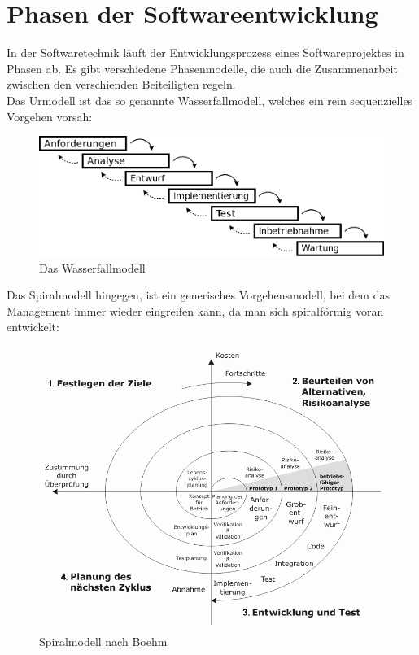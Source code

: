 \documentclass[a4paper,10pt,DIV9, BCOR12mm, oneside,openright,openbib]{scrreprt}
\theoremstyle{definition}
\theoremstyle{plain}
\begin{document}
\section{Phasen der Softwareentwicklung}
In der Softwaretechnik läuft der Entwicklungsprozess eines Softwareprojektes in Phasen ab. Es gibt verschiedene Phasenmodelle, die auch die Zusammenarbeit zwischen den verschienden Beiteiligten regeln. \\
Das Urmodell ist das so genannte Wasserfallmodell, welches ein rein sequenzielles Vorgehen vorsah:
\begin{figure}[h!]
 \centering
 \includegraphics[scale=0.8,keepaspectratio=true]{./Bilder/wmodell.png}
 \caption{Das Wasserfallmodell}
 \label{fig:Wasserfallmodell}
\end{figure}

Das Spiralmodell hingegen, ist ein generisches Vorgehensmodell, bei dem das Management immer wieder eingreifen kann, da man sich spiralförmig voran entwickelt:
\begin{figure}[h]
 \centering
 \includegraphics[scale=0.4,keepaspectratio=true]{./Bilder/Spiralmodel_nach_Boehm.png}
 \caption{Spiralmodell nach Boehm}
 \label{fig:Spiralmodell}
\end{figure}
\end{document}
